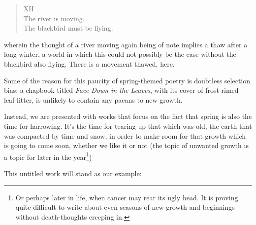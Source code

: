 \documentclass[12pt,oneside]{memoir}
\begin{document}
\begin{verse}
XII \\
The river is moving. \\
The blackbird must be flying.

\parencite{blackbird}
\end{verse}
wherein the thought of a river moving again being of note implies a thaw after a long winter, a world in which this could not possibly be the case without the blackbird also flying. There is a movement thawed, here.

Some of the reason for this paucity of spring-themed poetry is doubtless selection bias: a chapbook titled \emph{Face Down in the Leaves}, with its cover of frost-rimed leaf-litter, is unlikely to contain any paeans to new growth.

Instead, we are presented with works that focus on the fact that spring is also the time for harrowing. It's the time for tearing up that which was old, the earth that was compacted by time and snow, in order to make room for that growth which is going to come soon, whether we like it or not (the topic of unwanted growth is a topic for later in the year\footnote{Or perhaps later in life, when cancer may rear its ugly head. It is proving quite difficult to write about even seasons of new growth and beginnings without death-thoughts creeping in.})

This untitled work will stand as our example:
\end{document}
